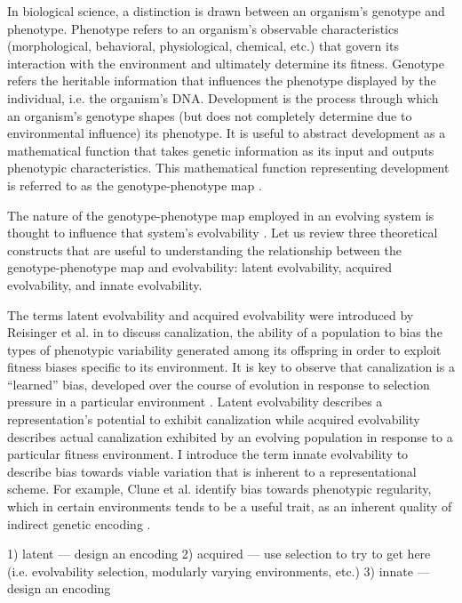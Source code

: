 In biological science, a distinction is drawn between an organism's genotype and phenotype.
Phenotype refers to an organism's observable characteristics (morphological, behavioral, physiological, chemical, etc.) that govern its interaction with the environment and ultimately determine its fitness.
Genotype refers the heritable information that influences the phenotype displayed by the individual, i.e. the organism's DNA.
Development is the process through which an organism's genotype shapes (but does not completely determine due to environmental influence) its phenotype.
It is useful to abstract development as a mathematical function that takes genetic information as its input and outputs phenotypic characteristics.
This mathematical function representing development is referred to as the genotype-phenotype map \cite{alberch1991genes}.

The nature of the genotype-phenotype map employed in an evolving system is thought to influence that system's evolvability \cite{pigliucci2010genotype}.
Let us review three theoretical constructs that are useful to understanding the relationship between the genotype-phenotype map and evolvability: latent evolvability, acquired evolvability, and innate evolvability.

The terms latent evolvability and acquired evolvability were introduced by Reisinger et al. in \cite{reisinger2005towards} to discuss canalization, the ability of a population to bias the types of phenotypic variability generated among its offspring in order to exploit fitness biases specific to its environment.
It is key to observe that canalization is a ``learned'' bias, developed over the course of evolution in response to selection pressure in a particular environment \cite{reisinger2005towards}.
Latent evolvability describes a representation's potential to exhibit canalization while acquired evolvability describes actual canalization exhibited by an evolving population in response to a particular fitness environment.
I introduce the term innate evolvability to describe bias towards viable variation that is inherent to a representational scheme.
For example, Clune et al. identify bias towards phenotypic regularity, which in certain environments tends to be a useful trait, as an inherent quality of indirect genetic encoding \cite{clune2008generative}.

1) latent --- design an encoding
2) acquired --- use selection to try to get here (i.e. evolvability selection, modularly varying environments, etc.)
3) innate --- design an encoding


